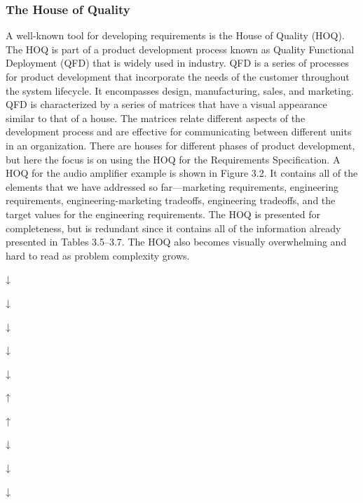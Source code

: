\subsubsection{The House of Quality}\label{the-house-of-quality}

A well-known tool for developing requirements is the House of Quality
(HOQ). The HOQ is part of a product development process known as Quality
Functional Deployment (QFD) that is widely used in industry. QFD is a
series of processes for product development that incorporate the needs
of the customer throughout the system lifecycle. It encompasses design,
manufacturing, sales, and marketing. QFD is characterized by a series of
matrices that have a visual appearance similar to that of a house. The
matrices relate different aspects of the development process and are
effective for communicating between different units in an organization.
There are houses for different phases of product development, but here
the focus is on using the HOQ for the Requirements Specification. A HOQ
for the audio amplifier example is shown in Figure 3.2. It contains all
of the elements that we have addressed so far---marketing requirements,
engineering requirements, engineering-marketing tradeoffs, engineering
tradeoffs, and the target values for the engineering requirements. The
HOQ is presented for completeness, but is redundant since it contains
all of the information already presented in Tables 3.5--3.7. The HOQ
also becomes visually overwhelming and hard to read as problem
complexity grows.

↓

↓

↓

↓

↓

↑

↑

↓

↓

↓

